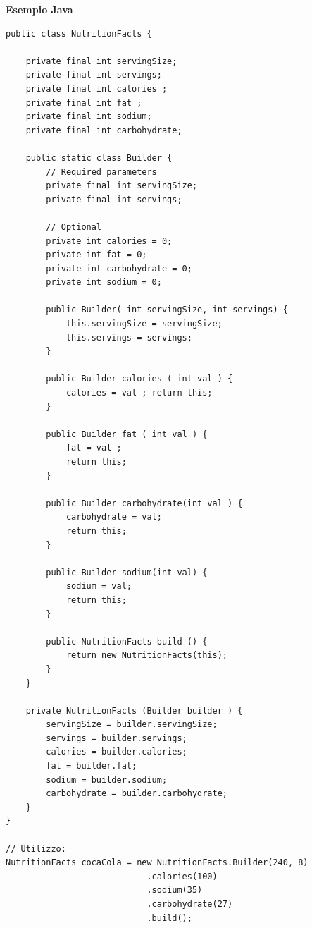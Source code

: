\newpage

\textbf{Esempio Java}

\begin{verbatim}
public class NutritionFacts { 

    private final int servingSize; 
    private final int servings; 
    private final int calories ; 
    private final int fat ; 
    private final int sodium; 
    private final int carbohydrate; 
    
    public static class Builder { 
        // Required parameters 
        private final int servingSize; 
        private final int servings; 
        
        // Optional 
        private int calories = 0; 
        private int fat = 0; 
        private int carbohydrate = 0; 
        private int sodium = 0; 
        
        public Builder( int servingSize, int servings) { 
            this.servingSize = servingSize; 
            this.servings = servings; 
        } 
        
        public Builder calories ( int val ) { 
            calories = val ; return this;
        } 
        
        public Builder fat ( int val ) { 
            fat = val ; 
            return this; 
        } 
        
        public Builder carbohydrate(int val ) {
            carbohydrate = val; 
            return this; 
        } 
        
        public Builder sodium(int val) { 
            sodium = val; 
            return this; 
        } 
        
        public NutritionFacts build () { 
            return new NutritionFacts(this); 
        } 
    }
    
    private NutritionFacts (Builder builder ) { 
        servingSize = builder.servingSize; 
        servings = builder.servings; 
        calories = builder.calories; 
        fat = builder.fat;
        sodium = builder.sodium; 
        carbohydrate = builder.carbohydrate;
    }
}

// Utilizzo:
NutritionFacts cocaCola = new NutritionFacts.Builder(240, 8)
                            .calories(100)
                            .sodium(35)
                            .carbohydrate(27)
                            .build();

\end{verbatim}

